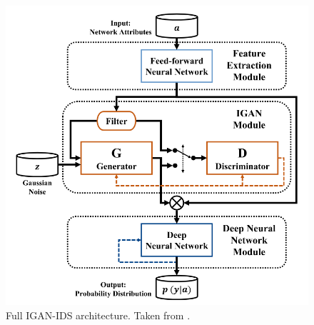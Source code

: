 \begin{figure}[htp]
\centering
\includegraphics[scale=0.5]{figures/igan_ids_arch.png}
\caption[IGAN-IDS Architecture]{Full IGAN-IDS architecture. Taken from \cite{huang.etal_IGAN_2020}.}
\label{fig:igan_ids}
\end{figure}


